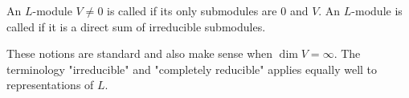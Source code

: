 An $L$-module $V \neq 0$ is called  if its only submodules are $0$ and $V$. An $L$-module is called  if it is a direct sum of irreducible submodules.

These notions are standard and also make sense when $\dim V = \infty$. The terminology "irreducible" and "completely reducible" applies equally well to representations of $L$.
